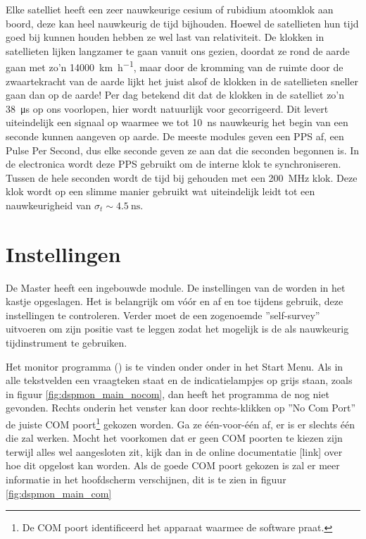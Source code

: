 Elke \gps satelliet heeft een zeer nauwkeurige cesium of rubidium
atoomklok aan boord, deze kan heel nauwkeurig de tijd bijhouden. Hoewel
de \gps satellieten hun tijd goed bij kunnen houden hebben ze wel last
van relativiteit. De klokken in \gps satellieten lijken langzamer te gaan
vanuit ons gezien, doordat ze rond de aarde gaan met zo'n
\SI{14000}{\kilo\meter\per\hour}, maar door de kromming van de ruimte
door de zwaartekracht van de aarde lijkt het juist alsof de klokken in de
\gps satellieten sneller gaan dan op de aarde! Per dag betekend dit dat
de klokken in de satelliet zo'n \SI{38}{\micro\second} op ons voorlopen,
hier wordt natuurlijk voor gecorrigeerd. Dit levert uiteindelijk een
signaal op waarmee we tot \SI{10}{\nano\second} nauwkeurig het begin van
een seconde kunnen aangeven op aarde. De meeste \gps modules geven een
PPS af, een Pulse Per Second, dus elke seconde geven ze aan dat die
seconden begonnen is. In de \hisparc electronica wordt deze PPS gebruikt
om de interne klok te synchroniseren. Tussen de hele seconden wordt de
tijd bij gehouden met een \SI{200}{\mega\hertz} klok. Deze klok wordt op
een slimme manier gebruikt wat uiteindelijk leidt tot een nauwkeurigheid
van $\sigma_t\sim\SI{4.5}{\nano\second}$.


\section{Instellingen}

De \hisparc Master heeft een ingebouwde \gps module. De instellingen van
de \gps worden in het kastje opgeslagen. Het is belangrijk om vóór en af
en toe tijdens gebruik, deze instellingen te controleren. Verder moet de
\gps een zogenoemde ''self-survey'' uitvoeren om zijn positie vast te
leggen zodat het mogelijk is de \gps als nauwkeurig tijdinstrument te
gebruiken.

Het \gps monitor programma (\dspmon) is te vinden onder onder \hisparc
in het Start Menu. Als in alle tekstvelden een vraagteken staat en de
indicatielampjes op grijs staan, zoals in figuur \ref{fig:dspmon_main_nocom}, dan heeft
het programma de \gps nog niet gevonden. Rechts onderin het venster kan
door rechts-klikken op ''No Com Port'' de juiste COM poort\footnote{De
COM poort identificeerd het apparaat waarmee de software praat.} gekozen
worden. Ga ze één-voor-één af, er is er slechts één die zal werken.
Mocht het voorkomen dat er geen COM poorten te kiezen zijn terwijl alles
wel aangesloten zit, kijk dan in de online documentatie [link] over hoe
dit opgelost kan worden. Als de goede COM poort gekozen is zal er meer
informatie in het hoofdscherm verschijnen, dit is te zien in figuur
\ref{fig:dspmon_main_com}

